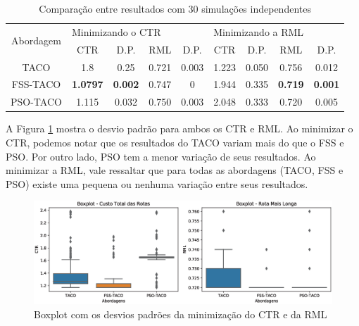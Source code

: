 \begin{table}[htb]
    \centering
    \caption{Comparação entre resultados com 30 simulações independentes} \label{tab:resultado-comparison}
\begin{tabular}{|c|c|c|c|c|c|c|c|c|}
\hline
\multirow{2}{*}{Abordagem} & \multicolumn{4}{l|}{Minimizando o CTR}           & \multicolumn{4}{l|}{Minimizando a RML}          \\ \cline{2-9} 
                            & CTR             & D.P.           & RML   & D.P.  & CTR   & D.P.  & RML            & D.P.           \\ \hline
TACO                       & 1.8             & 0.25           & 0.721 & 0.003 & 1.223 & 0.050 & 0.756          & 0.012          \\ \hline
FSS-TACO                   & \textbf{1.0797} & \textbf{0.002} & 0.747 & 0     & 1.944 & 0.335 & \textbf{0.719} & \textbf{0.001} \\ \hline
PSO-TACO                   & 1.115           & 0.032          & 0.750 & 0.003 & 2.048 & 0.333 & 0.720          & 0.005          \\ \hline
\end{tabular}
\end{table}

A Figura \ref{fig:resultados-boxplot} mostra o desvio padrão para ambos os CTR e RML. Ao minimizar o CTR, podemos notar que os resultados do TACO variam mais do que o FSS e PSO. Por outro lado, PSO tem a menor variação de seus resultados. Ao minimizar a RML, vale ressaltar que para todas as abordagens (TACO, FSS e PSO) existe uma pequena ou nenhuma variação entre seus resultados.

\begin{figure}[htb]
    \centering
    \includegraphics[width=\textwidth]{imagens/boxplot-approaches.eps}
    \caption{Boxplot com os desvios padrões da minimização do CTR e da RML} \label{fig:resultados-boxplot}
\end{figure}

